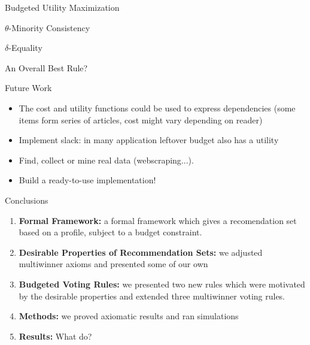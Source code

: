 \documentclass{beamer}
\begin{document}
\begin{frame}{Budgeted Utility Maximization}
	
\end{frame}

\begin{frame}{$\theta$-Minority Consistency}
	
\end{frame}

\begin{frame}{$\delta$-Equality}
	
\end{frame}

\begin{frame}{An Overall Best Rule?}
	
\end{frame}

\begin{frame}{Future Work}

\begin{itemize}
	\item The cost and utility functions could be used to express dependencies (some items form series of articles, cost might vary depending on reader)
	\item Implement slack: in many application leftover budget also has a utility
	\item Find, collect or mine real data (webscraping...).
	\item Build a ready-to-use implementation!
	
\end{itemize}
	
\end{frame}

\begin{frame}{Conclusions}


\begin{enumerate}
	\item \textbf{Formal Framework:} a formal framework which gives a recomendation set based on a profile, subject to a budget constraint.
	\item \textbf{Desirable Properties of Recommendation Sets:} we adjusted multiwinner axioms and presented some of our own
	\item \textbf{Budgeted Voting Rules:} we presented two new rules which were motivated by the desirable properties and extended three multiwinner voting rules.
	\item \textbf{Methods:} we proved axiomatic results and ran simulations
	\item \textbf{Results:} What do?
\end{enumerate}

\end{frame}

%
%


%
\end{document}
